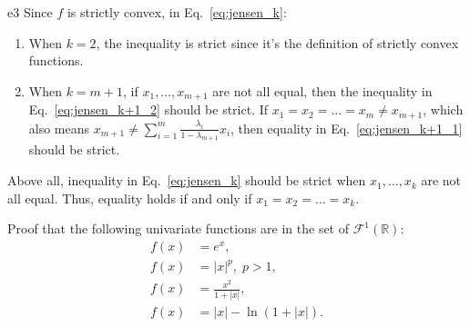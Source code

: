 \documentclass{article}
\begin{document}
\begin{PROOF}{e3}
Since $f$ is strictly convex, in Eq.~\ref{eq:jensen_k}:
\begin{enumerate}
    \item When $k = 2$, the inequality is strict since it's the definition of strictly convex functions.
    \item When $k = m+1$, if $x_1, \dots, x_{m+1}$ are not all equal, then the inequality in Eq.~\ref{eq:jensen_k+1_2} should be strict. If $x_1 = x_2 = \dots = x_m \ne x_{m+1}$, which also means $x_{m + 1} \ne \sum_{i=1}^m \frac{\lambda_i}{1-\lambda_{m+1}} x_i$, then equality in Eq.~\ref{eq:jensen_k+1_1} should be strict.
\end{enumerate}
Above all, inequality in Eq.~\ref{eq:jensen_k} should be strict when $x_1, \dots, x_k$ are not all equal. Thus, equality holds if and only if $x_1 = x_2 = \dots = x_k$.
\end{PROOF}

\begin{excercise}\label{e4}
Proof that the following univariate functions are in the set of $\mathcal{F}^1(\mathbb{R})$:
\begin{align}
f(x) &= e^x,\nonumber \\
f(x) &= |x|^p,\; p > 1,\nonumber \\
f(x) &= \frac{x^2}{1 + |x|},\nonumber \\
f(x) &= |x| - \ln (1 + |x|).\nonumber
\end{align}
\end{excercise}
\end{document}
